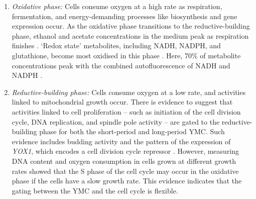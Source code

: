 \begin{enumerate}
  \item \emph{Oxidative phase:} Cells consume oxygen at a high rate as respiration, fermentation, and
        energy-demanding processes
        like biosynthesis and gene expression occur.
    As the oxidative phase transitions to the reductive-building phase, ethanol and acetate concentrations in the medium peak as respiration finishes \citep{tuLogicYeastMetabolic2005}.
    `Redox state' metabolites, including NADH, NADPH, and glutathione, become most oxidised in this phase \citep{lloydUltradianMetronomeTimekeeper2005}.
Here, 70\% of metabolite concentrations peak with the combined autofluorescence of NADH and NADPH \citep{murrayRegulationYeastOscillatory2007}.
\item \emph{Reductive-building phase:} Cells consume oxygen at a low rate, and activities linked to mitochondrial growth occur.
  There is evidence to suggest that activities linked to cell proliferation -- such as initiation of the cell division cycle, DNA replication, and spindle pole activity -- are gated to the reductive-building phase for both the short-period and long-period YMC.
  Such evidence includes budding activity and the pattern of the expression of \emph{YOX1}, which encodes a cell division cycle repressor \citep{tuLogicYeastMetabolic2005}.
  However, measuring DNA content and oxygen consumption in cells grown at different growth rates \citep{slavovCouplingGrowthRate2011} showed that the S phase of the cell cycle may occur in the oxidative phase if the cells have a slow growth rate.
  This evidence indicates that the gating between the YMC and the cell cycle is flexible.

\end{enumerate}
